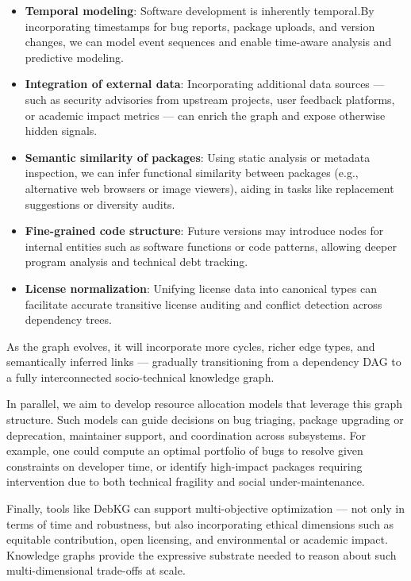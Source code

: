 \documentclass[10pt,oneside,a4paper, twocolumn]{article}
\begin{document}
    \begin{itemize}
        \item \textbf{Temporal modeling}: Software development is inherently temporal.By incorporating timestamps for bug reports, package uploads, and version changes, we can model event sequences and enable time-aware analysis and predictive modeling.

        \item \textbf{Integration of external data}: Incorporating additional data sources — such as security advisories from upstream projects, user feedback platforms, or academic impact metrics — can enrich the graph and expose otherwise hidden signals.

        \item \textbf{Semantic similarity of packages}: Using static analysis or metadata inspection, we can infer functional similarity between packages (e.g., alternative web browsers or image viewers), aiding in tasks like replacement suggestions or diversity audits.

        \item \textbf{Fine-grained code structure}: Future versions may introduce nodes for internal entities such as software functions or code patterns, allowing deeper program analysis and technical debt tracking.

        \item \textbf{License normalization}: Unifying license data into canonical types can facilitate accurate transitive license auditing and conflict detection across dependency trees.
    \end{itemize}

    As the graph evolves, it will incorporate more cycles, richer edge types, and semantically inferred links — gradually transitioning from a dependency DAG to a fully interconnected socio-technical knowledge graph.

    In parallel, we aim to develop resource allocation models that leverage this graph structure.
    Such models can guide decisions on bug triaging, package upgrading or deprecation, maintainer support, and coordination across subsystems.
    For example, one could compute an optimal portfolio of bugs to resolve given constraints on developer time, or identify high-impact packages requiring intervention due to both technical fragility and social under-maintenance.

    Finally, tools like DebKG can support multi-objective optimization — not only in terms of time and robustness, but also incorporating ethical dimensions such as equitable contribution, open licensing, and environmental or academic impact.
    Knowledge graphs provide the expressive substrate needed to reason about such multi-dimensional trade-offs at scale.


    
    
\end{document}
